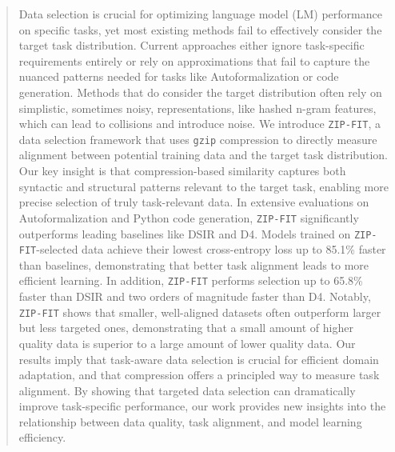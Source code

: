 \begin{abstract}
    Data selection is crucial for optimizing language model (LM) performance on specific tasks, yet most existing methods fail to effectively consider the target task distribution. 
    Current approaches either ignore task-specific requirements entirely or rely on approximations that fail to capture the nuanced patterns needed for tasks like Autoformalization or code generation.
    Methods that do consider the target distribution often rely on simplistic, sometimes noisy, representations, like hashed n-gram features, which can lead to collisions and introduce noise.
    We introduce \texttt{ZIP-FIT}, a data selection framework that uses \texttt{gzip} compression to directly measure alignment between potential training data and the target task distribution.
    Our key insight is that compression-based similarity captures both syntactic and structural patterns relevant to the target task, enabling more precise selection of truly task-relevant data.
    In extensive evaluations on Autoformalization and Python code generation, \texttt{ZIP-FIT} significantly outperforms leading baselines like DSIR and D4. Models trained on \texttt{ZIP-FIT}-selected data achieve their lowest cross-entropy loss up to 85.1\% faster than baselines, demonstrating that better task alignment leads to more efficient learning. In addition, \texttt{ZIP-FIT} performs selection up to 65.8\% faster than DSIR and two orders of magnitude faster than D4. Notably, \texttt{ZIP-FIT} shows that smaller, well-aligned datasets often outperform larger but less targeted ones, demonstrating that a small amount of higher quality data is superior to a large amount of lower quality data. Our results imply that task-aware data selection is crucial for efficient domain adaptation, and that compression offers a principled way to measure task alignment. By showing that targeted data selection can dramatically improve task-specific performance, our work provides new insights into the relationship between data quality, task alignment, and model learning efficiency.
\end{abstract}
